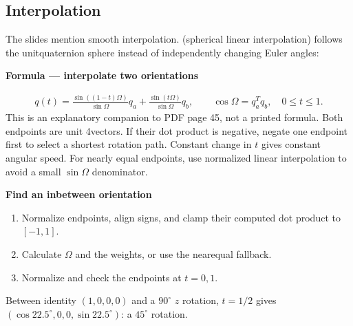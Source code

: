 \documentclass[letterpaper,11pt,english,openany,oneside]{jupyterBook}
\begin{document}
\subsection{Interpolation}
\label{\detokenize{lectures/lecture02/quaternions:interpolation}}
\sphinxAtStartPar
The slides mention smooth interpolation.  (spherical linear interpolation) follows the unit\sphinxhyphen{}quaternion sphere instead of independently changing Euler angles:

\begin{TextbookBox}
\textbf{Formula — interpolate two orientations}\par\smallskip
\begin{equation}\label{equation:lectures/lecture02/quaternions:eq-lec02-slerp}
\begin{split}q(t)=\frac{\sin((1-t)\Omega)}{\sin\Omega}q_a+
\frac{\sin(t\Omega)}{\sin\Omega}q_b,
\qquad \cos\Omega=q_a^Tq_b,\quad 0\le t\le1.\end{split}
\end{equation}
\sphinxAtStartPar
This is an explanatory companion to PDF page 45, not a printed formula. Both endpoints are unit 4\sphinxhyphen{}vectors. If their dot product is negative, negate one endpoint first to select a shortest rotation path. Constant change in \(t\) gives constant angular speed. For nearly equal endpoints, use normalized linear interpolation to avoid a small \(\sin\Omega\) denominator.

\end{TextbookBox}

\begin{TextbookBox}
\textbf{Find an in\sphinxhyphen{}between orientation}\par\smallskip
\begin{enumerate}
%
\item {}
\sphinxAtStartPar
Normalize endpoints, align signs, and clamp their computed dot product to \([-1,1]\).

\item {}
\sphinxAtStartPar
Calculate \(\Omega\) and the weights, or use the near\sphinxhyphen{}equal fallback.

\item {}
\sphinxAtStartPar
Normalize and check the endpoints at \(t=0,1\).

\end{enumerate}

\sphinxAtStartPar
Between identity \((1,0,0,0)\) and a \(90^\circ\) \(z\) rotation, \(t=1/2\) gives \((\cos22.5^\circ,0,0,\sin22.5^\circ)\): a \(45^\circ\) rotation.

\end{TextbookBox}
\end{document}
